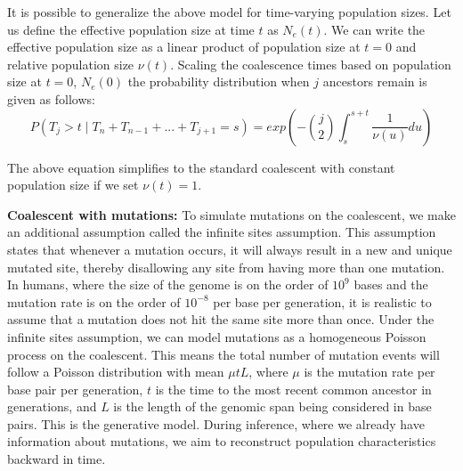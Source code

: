 It is possible to generalize the above model for time-varying population sizes. Let us define the effective population size at time $t$ as $N_e(t)$. We can write the effective population size as a linear product of population size at $t=0$ and relative population size $\nu(t)$. Scaling the coalescence times based on population size at $t=0$, $N_e(0)$ the probability distribution when $j$ ancestors remain is given as follows:
\begin{equation}
    P(T_j > t \mid T_n + T_{n-1} + ... + T_{j+1} = s) = exp\left( - \binom{j}{2} \int_{s}^{s+t} \frac{1}{\nu(u)} du  \right)
\label{eq:coal_general}
\end{equation}

The above equation simplifies to the standard coalescent with constant population size if we set $\nu(t) = 1$. 


\textbf{Coalescent with mutations:} To simulate mutations on the coalescent, we make an additional assumption called the infinite sites assumption. This assumption states that whenever a mutation occurs, it will always result in a new and unique mutated site, thereby disallowing any site from having more than one mutation. In humans, where the size of the genome is on the order of \(10^9\) bases and the mutation rate is on the order of \(10^{-8}\) per base per generation, it is realistic to assume that a mutation does not hit the same site more than once. Under the infinite sites assumption, we can model mutations as a homogeneous Poisson process on the coalescent. This means the total number of mutation events will follow a Poisson distribution with mean \(\mu t L\), where \(\mu\) is the mutation rate per base pair per generation, \(t\) is the time to the most recent common ancestor in generations, and \(L\) is the length of the genomic span being considered in base pairs. This is the generative model. During inference, where we already have information about mutations, we aim to reconstruct population characteristics backward in time.

